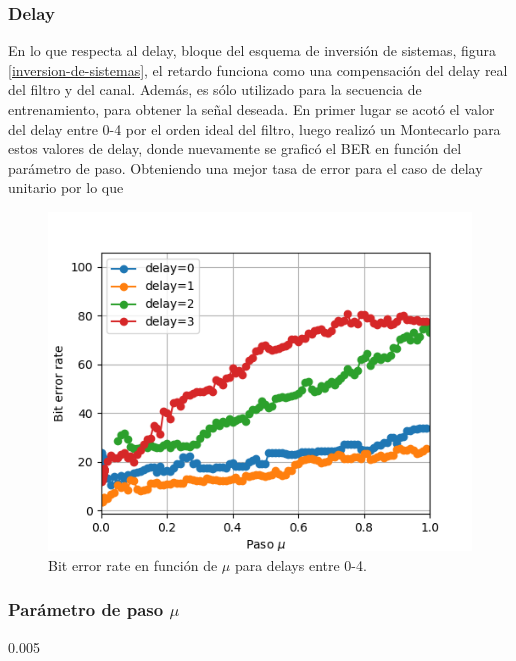 \documentclass[main.tex]{subfiles}
\begin{document}
\subsubsection*{Delay}
En lo que respecta al delay, bloque del esquema de inversión de sistemas, 
figura \ref{inversion-de-sistemas}, el retardo funciona como una compensación del delay real
del filtro y del canal. Además, es sólo utilizado para la secuencia de entrenamiento, para obtener la señal deseada.
En primer lugar se acotó el valor del delay entre 0-4 por el orden ideal del filtro, 
luego realizó un Montecarlo para estos valores de delay, donde nuevamente se
graficó el BER en función del parámetro de paso. Obteniendo una mejor tasa de error 
para el caso de delay unitario por lo que
\begin{figure}[H]
    \centering
    \includegraphics[scale=0.6]{imagenes/delay.png}
    \caption{Bit error rate en función de $\mu$ para delays entre 0-4.}
\end{figure}


\subsubsection*{Parámetro de paso $\mu$}
0.005
\end{document}
